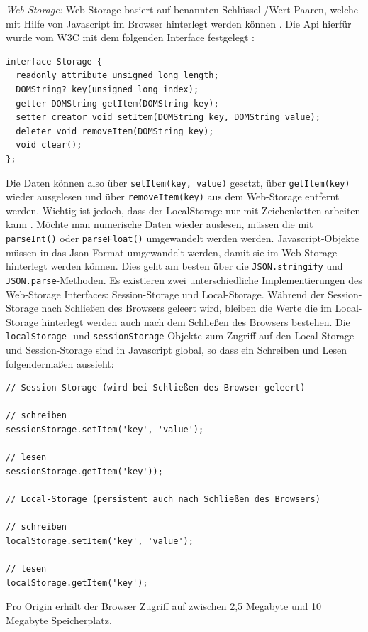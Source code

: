 \emph{Web-Storage:}
Web-Storage basiert auf benannten Schlüssel-/Wert Paaren, welche mit Hilfe von Javascript im Browser hinterlegt werden können \cite{html5_up_and_running_chapter_7}. Die Api hierfür wurde vom W3C mit dem folgenden Interface festgelegt \cite{web_storage_w3c}:
\begin{lstlisting}
interface Storage {
  readonly attribute unsigned long length;
  DOMString? key(unsigned long index);
  getter DOMString getItem(DOMString key);
  setter creator void setItem(DOMString key, DOMString value);
  deleter void removeItem(DOMString key);
  void clear();
};
\end{lstlisting}
Die Daten können also über \texttt{setItem(key, value)} gesetzt, über \texttt{getItem(key)} wieder ausgelesen und über \texttt{removeItem(key)} aus dem Web-Storage entfernt werden. Wichtig ist jedoch, dass der LocalStorage nur mit Zeichenketten arbeiten kann \cite{web_storage_w3c}. Möchte man numerische Daten wieder auslesen, müssen die mit \texttt{parseInt()} oder \texttt{parseFloat()} umgewandelt werden werden. Javascript-Objekte müssen in das Json Format umgewandelt werden, damit sie im Web-Storage hinterlegt werden können. Dies geht am besten über die \texttt{JSON.stringify} und \texttt{JSON.parse}-Methoden. Es existieren zwei unterschiedliche Implementierungen des Web-Storage Interfaces: Session-Storage und Local-Storage. Während der Session-Storage nach Schließen des Browsers geleert wird, bleiben die Werte die im Local-Storage hinterlegt werden auch nach dem Schließen des Browsers bestehen. Die \texttt{localStorage}- und \texttt{sessionStorage}-Objekte zum Zugriff auf den Local-Storage und Session-Storage sind in Javascript global, so dass ein Schreiben und Lesen folgendermaßen aussieht:
\begin{lstlisting}
// Session-Storage (wird bei Schließen des Browser geleert)

// schreiben
sessionStorage.setItem('key', 'value');
 
// lesen 
sessionStorage.getItem('key'));

// Local-Storage (persistent auch nach Schließen des Browsers)

// schreiben
localStorage.setItem('key', 'value');
 
// lesen
localStorage.getItem('key');
\end{lstlisting}

Pro Origin erhält der Browser Zugriff auf zwischen 2,5 Megabyte und 10 Megabyte Speicherplatz.

